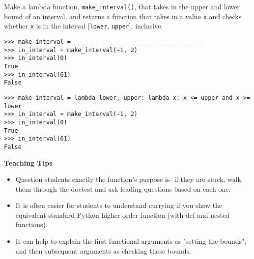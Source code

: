 \begin{blocksection}
\question Make a lambda function, \lstinline$make_interval()$, that takes in the upper and lower bound of an interval, and returns a function that takes in a value \lstinline$x$ and checks whether \lstinline$x$ is in the interval [\lstinline$lower$, \lstinline$upper$], inclusive.

\begin{lstlisting}
>>> make_interval = _____________________________________
>>> in_interval = make_interval(-1, 2)
>>> in_interval(0)
True
>>> in_interval(61)
False

\end{lstlisting}

\begin{solution}[1in]
\begin{lstlisting}
>>> make_interval = lambda lower, upper: lambda x: x <= upper and x >= lower
>>> in_interval = make_interval(-1, 2)
>>> in_interval(0)
True
>>> in_interval(61)
False

\end{lstlisting}
\end{solution}

\begin{blocksection}
 \begin{guide}
   \textbf{Teaching Tips}
   \begin{itemize}
   	   \item Question students exactly the function's purpose is- if they are stuck, walk them through the doctest and ask leading questions based on each one. 
   	   \item It is often easier for students to understand currying if you show the equivalent standard Python higher-order function (with def and nested functions).
   	   \item It can help to explain the first functional arguments as "setting the bounds", and then subsequent arguments as checking those bounds. 
   \end{itemize}
 \end{guide}
\end{blocksection}
 
\end{blocksection}